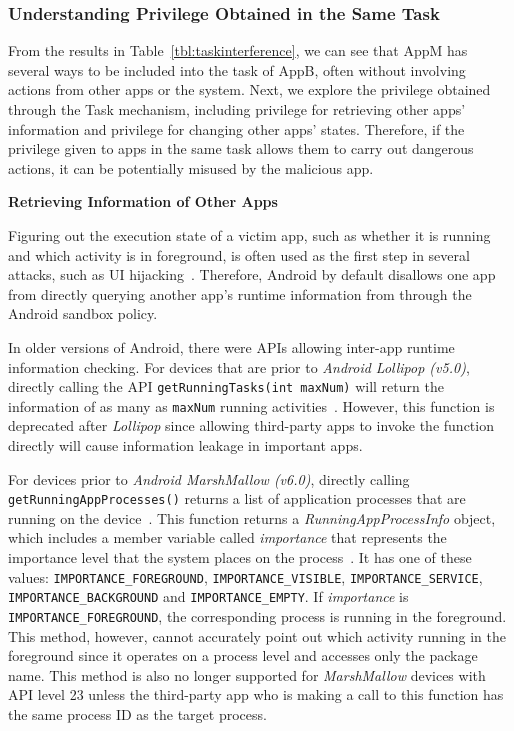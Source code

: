 \documentclass[letterpaper,12pt]{article}
\begin{document}
\subsubsection{Understanding Privilege Obtained in the Same Task}
\label{sec:priv}

From the results in Table~\ref{tbl:taskinterference}, we can see that
AppM has several ways to be included into the task of AppB, often
without involving actions from other apps or the system. Next, we
explore the privilege obtained through the Task mechanism, including
privilege for retrieving other apps' information and privilege for
changing other apps' states. Therefore, if the privilege given to apps
in the same task allows them to carry out dangerous actions, it can be
potentially misused by the malicious app.

\textbf{Retrieving Information of Other Apps}

\noindent

Figuring out the execution state of a victim app, such as whether it
is running and which activity is in foreground, is often used as the
first step in several attacks, such as UI
hijacking~\cite{UIstateinference}. Therefore, Android by default disallows one app
from directly querying another app's runtime information from through
the Android sandbox policy.

In older versions of Android, there were APIs allowing inter-app
runtime information checking.
For devices that are prior to \textit{Android Lollipop
  (v5.0)}, directly calling the API
\texttt{getRunningTasks(int maxNum)} will return the information of as
many as \texttt{maxNum} running activities~\cite{getrunningtask}.
However, this function is deprecated after \textit{Lollipop} since allowing third-party apps to invoke the function
directly will cause information leakage in important apps.

For devices prior to \textit{Android MarshMallow (v6.0)}, directly
calling \\
\texttt{getRunningAppProcesses()} returns a list of
application processes that are running on the
device~\cite{getrunningtask}. This function returns a
\textit{RunningAppProcessInfo} object, which includes a member
variable called \textit{importance} that represents the importance
level that the system places on the
process~\cite{processimportance}. It has one of these values:
\texttt{IMPORTANCE\_FOREGROUND}, \texttt{IMPORTANCE\_VISIBLE},
\texttt{IMPORTANCE\_SERVICE}, \texttt{IMPORTANCE\_BACKGROUND} and
\texttt{IMPORTANCE\_EMPTY}. If \textit{importance} is
\texttt{IMPORTANCE\_FOREGROUND}, the corresponding process is running
in the foreground. This method, however, cannot accurately point out
which activity running in the foreground since it operates on a
process level and accesses only the package name.  This method is also
no longer supported for \textit{MarshMallow} devices with API level 23
unless the third-party app who is making a call to this function has
the same process ID as the target process.
\end{document}
